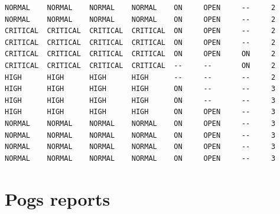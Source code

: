 \documentclass[a4paper, titlepage]{article}
\begin{document}
{\begin{lstlisting}
NORMAL    NORMAL    NORMAL    NORMAL    ON     OPEN     --     2
NORMAL    NORMAL    NORMAL    NORMAL    ON     OPEN     --     2
CRITICAL  CRITICAL  CRITICAL  CRITICAL  ON     OPEN     --     2
CRITICAL  CRITICAL  CRITICAL  CRITICAL  ON     OPEN     --     2
CRITICAL  CRITICAL  CRITICAL  CRITICAL  ON     OPEN     ON     2
CRITICAL  CRITICAL  CRITICAL  CRITICAL  --     --       ON     2
HIGH      HIGH      HIGH      HIGH      --     --       --     2
HIGH      HIGH      HIGH      HIGH      ON     --       --     3
HIGH      HIGH      HIGH      HIGH      ON     --       --     3
HIGH      HIGH      HIGH      HIGH      ON     OPEN     --     3
NORMAL    NORMAL    NORMAL    NORMAL    ON     OPEN     --     3
NORMAL    NORMAL    NORMAL    NORMAL    ON     OPEN     --     3
NORMAL    NORMAL    NORMAL    NORMAL    ON     OPEN     --     3
NORMAL    NORMAL    NORMAL    NORMAL    ON     OPEN     --     3
\end{lstlisting}
}
\section{Pogs reports}
\end{document}
